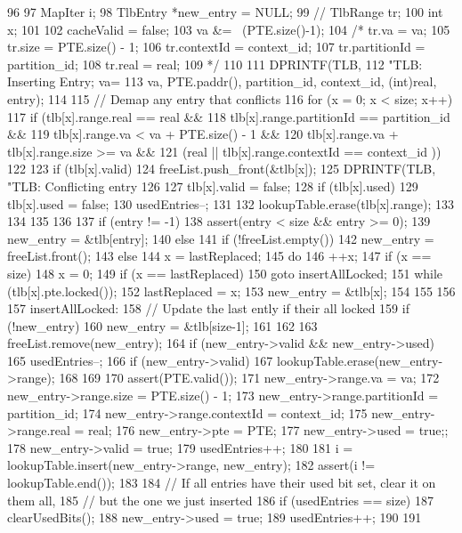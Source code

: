 \begin{DoxyCode}
96 {
97     MapIter i;
98     TlbEntry *new_entry = NULL;
99 //    TlbRange tr;
100     int x;
101 
102     cacheValid = false;
103     va &= ~(PTE.size()-1);
104  /*   tr.va = va;
105     tr.size = PTE.size() - 1;
106     tr.contextId = context_id;
107     tr.partitionId = partition_id;
108     tr.real = real;
109 */
110 
111     DPRINTF(TLB,
112         "TLB: Inserting Entry; va=%
113         va, PTE.paddr(), partition_id, context_id, (int)real, entry);
114 
115     // Demap any entry that conflicts
116     for (x = 0; x < size; x++) {
117         if (tlb[x].range.real == real &&
118             tlb[x].range.partitionId == partition_id &&
119             tlb[x].range.va < va + PTE.size() - 1 &&
120             tlb[x].range.va + tlb[x].range.size >= va &&
121             (real || tlb[x].range.contextId == context_id ))
122         {
123             if (tlb[x].valid) {
124                 freeList.push_front(&tlb[x]);
125                 DPRINTF(TLB, "TLB: Conflicting entry %
126 
127                 tlb[x].valid = false;
128                 if (tlb[x].used) {
129                     tlb[x].used = false;
130                     usedEntries--;
131                 }
132                 lookupTable.erase(tlb[x].range);
133             }
134         }
135     }
136 
137     if (entry != -1) {
138         assert(entry < size && entry >= 0);
139         new_entry = &tlb[entry];
140     } else {
141         if (!freeList.empty()) {
142             new_entry = freeList.front();
143         } else {
144             x = lastReplaced;
145             do {
146                 ++x;
147                 if (x == size)
148                     x = 0;
149                 if (x == lastReplaced)
150                     goto insertAllLocked;
151             } while (tlb[x].pte.locked());
152             lastReplaced = x;
153             new_entry = &tlb[x];
154         }
155     }
156 
157 insertAllLocked:
158     // Update the last ently if their all locked
159     if (!new_entry) {
160         new_entry = &tlb[size-1];
161     }
162 
163     freeList.remove(new_entry);
164     if (new_entry->valid && new_entry->used)
165         usedEntries--;
166     if (new_entry->valid)
167         lookupTable.erase(new_entry->range);
168 
169 
170     assert(PTE.valid());
171     new_entry->range.va = va;
172     new_entry->range.size = PTE.size() - 1;
173     new_entry->range.partitionId = partition_id;
174     new_entry->range.contextId = context_id;
175     new_entry->range.real = real;
176     new_entry->pte = PTE;
177     new_entry->used = true;;
178     new_entry->valid = true;
179     usedEntries++;
180 
181     i = lookupTable.insert(new_entry->range, new_entry);
182     assert(i != lookupTable.end());
183 
184     // If all entries have their used bit set, clear it on them all,
185     // but the one we just inserted
186     if (usedEntries == size) {
187         clearUsedBits();
188         new_entry->used = true;
189         usedEntries++;
190     }
191 }
\end{DoxyCode}
